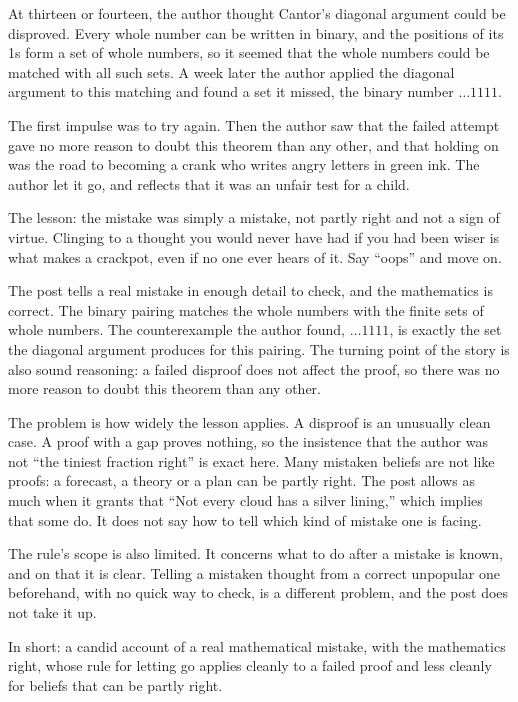 \begin{afterword}
\summaryhead

At thirteen or fourteen, the author thought Cantor's diagonal argument could be disproved. Every whole number can be written in binary, and the positions of its 1s form a set of whole numbers, so it seemed that the whole numbers could be matched with all such sets. A week later the author applied the diagonal argument to this matching and found a set it missed, the binary number $\ldots1111$.

The first impulse was to try again. Then the author saw that the failed attempt gave no more reason to doubt this theorem than any other, and that holding on was the road to becoming a crank who writes angry letters in green ink. The author let it go, and reflects that it was an unfair test for a child.

The lesson: the mistake was simply a mistake, not partly right and not a sign of virtue. Clinging to a thought you would never have had if you had been wiser is what makes a crackpot, even if no one ever hears of it. Say ``oops'' and move on.

\responsehead

The post tells a real mistake in enough detail to check, and the mathematics is correct. The binary pairing matches the whole numbers with the finite sets of whole numbers. The counterexample the author found, $\ldots1111$, is exactly the set the diagonal argument produces for this pairing. The turning point of the story is also sound reasoning: a failed disproof does not affect the proof, so there was no more reason to doubt this theorem than any other.

The problem is how widely the lesson applies. A disproof is an unusually clean case. A proof with a gap proves nothing, so the insistence that the author was not ``the tiniest fraction right'' is exact here. Many mistaken beliefs are not like proofs: a forecast, a theory or a plan can be partly right. The post allows as much when it grants that ``Not every cloud has a silver lining,'' which implies that some do. It does not say how to tell which kind of mistake one is facing.

The rule's scope is also limited. It concerns what to do after a mistake is known, and on that it is clear. Telling a mistaken thought from a correct unpopular one beforehand, with no quick way to check, is a different problem, and the post does not take it up.

In short: a candid account of a real mathematical mistake, with the mathematics right, whose rule for letting go applies cleanly to a failed proof and less cleanly for beliefs that can be partly right.
\end{afterword}
